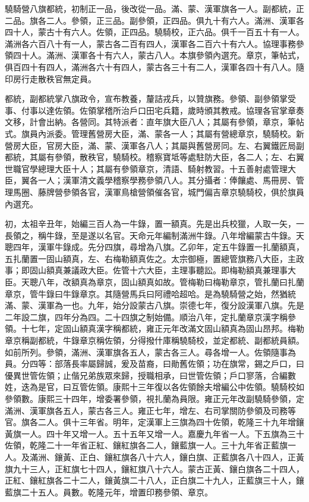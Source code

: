 \begin{pinyinscope}
驍騎營八旗都統，初制正一品，後改從一品。滿、蒙、漢軍旗各一人。副都統，正二品。旗各二人。參領，正三品。副參領，正四品。俱九十有六人。滿洲、漢軍各四十人，蒙古十有六人。佐領，正四品。驍騎校，正六品。俱千一百五十有一人。滿洲各六百八十有一人，蒙古各二百有四人，漢軍各二百六十有六人。協理事務參領四十人。滿洲、漢軍各十有六人，蒙古八人。本旗參領內選充。章京，筆帖式，俱百四十有四人，滿洲各六十有四人，蒙古各三十有二人，漢軍各四十有八人。隨印房行走散秩官無定員。

都統，副都統掌八旗政令，宣布教養，釐詰戎兵，以贊旗務。參領、副參領掌受事、付事以達佐領。佐領掌稽所治戶口田宅兵籍，歲時頒其教戒。協理各官掌章奏文移，計會出納。各營同。其特派者：直年旗大臣八人；其屬有參領，章京，筆帖式。旗員內派委。管理舊營房大臣，滿、蒙各一人；其屬有營總章京，驍騎校。新營房大臣，官房大臣，滿、蒙、漢軍各八人；其屬與舊營房同。左、右翼鐵匠局副都統，其屬有參領，散秩官，驍騎校。稽察寶坻等處駐防大臣，各二人；左、右翼世職官學總理大臣十人；其屬有參領章京，清語、騎射教習。十五善射處管理大臣，翼各一人；漢軍清文義學稽察學務參領八人。其分攝者：俸饟處、馬冊房、管理馬圈、藤牌營參領各官，漢軍鳥槍營領催各官，城門偏吉章京驍騎校，俱於旗員內選充。

初，太祖辛丑年，始編三百人為一牛錄，置一額真。先是出兵校獵，人取一矢，一長領之，稱牛錄，至是遂以名官。天命元年編制滿洲牛錄。八年增編蒙古牛錄。天聰四年，漢軍牛錄成。先分四旗，尋增為八旗。乙卯年，定五牛錄置一扎蘭額真，五扎蘭置一固山額真，左、右梅勒額真佐之。太宗御極，置總管旗務八大臣，主政事；即固山額真兼議政大臣。佐管十六大臣，主理事聽訟。即梅勒額真兼理事大臣。天聰八年，改額真為章京，固山額真如故。管梅勒曰梅勒章京，管扎蘭曰扎蘭章京，管牛錄曰牛錄章京。其隨營馬兵曰阿禮哈超哈。是為驍騎營之始，然猶統滿、蒙、漢軍為一也。九年，始分設蒙古八旗。崇德七年，復分設漢軍八旗。先是二年設二旗，四年分為四。二十四旗之制始備。順治八年，定扎蘭章京漢字稱參領。十七年，定固山額真漢字稱都統，雍正元年改滿文固山額真為固山昂邦。梅勒章京稱副都統，牛錄章京稱佐領，分得撥什庫稱驍騎校，並定都統、副都統員額。如前所列。參領，滿洲、漢軍旗各五人，蒙古各三人。尋各增一人。佐領隨事為員。分四等：部落長率屬歸誠，爰及苗裔，曰勛舊佐領；功在旗常，錫之戶口，曰優異世管佐領；止偕兄弟族眾來歸，授職相承，曰世管佐領；戶口寥落，合編數姓，迭為是官，曰互管佐領。康熙十三年復以各佐領餘夫增編公中佐領。驍騎校如參領數。康熙三十四年，增委署參領，視扎蘭為員限。雍正元年改副驍騎參領，定滿洲、漢軍旗各五人，蒙古各三人。雍正七年，增左、右司掌關防參領及司務等官。旗各二人。俱十三年省。明年，定漢軍上三旗為四十佐領，乾隆三十九年增鑲黃旗一人。四十年又增一人。五十五年又增一人。嘉慶九年省一人。下五旗為三十佐領，乾隆二十一年省正紅、鑲紅旗各二人，鑲藍旗一人。三十九年省正藍旗一人。及滿洲、鑲黃、正白、鑲紅旗各八十六人，鑲白旗、正藍旗各八十四人，正黃旗九十三人，正紅旗七十四人，鑲紅旗八十六人。蒙古正黃、鑲白旗各二十四人，正紅、鑲紅旗各二十二人，鑲黃旗二十八人，正白旗二十九人，正藍旗三十人，鑲藍旗二十五人。員數。乾隆元年，增置印務參領、章京。


\end{pinyinscope}
